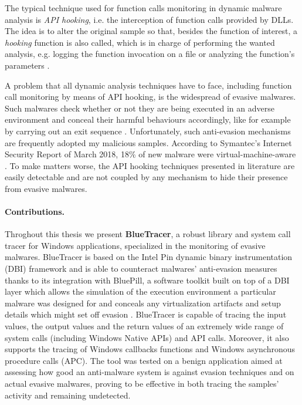 The typical technique used for function calls monitoring in dynamic malware analysis is \textit{API hooking}, i.e. the interception of function calls provided by DLLs. The idea is to alter the original sample so that, besides the function of interest, a \textit{hooking} function is also called, which is in charge of performing the wanted analysis, e.g. logging the function invocation on a file or analyzing the function's parameters \cite{Egele:2008:SAD:2089125.2089126}.      

A problem that all dynamic analysis techniques have to face, including function call monitoring by means of API hooking, is the widespread of evasive malwares. Such malwares check whether or not they are being executed in an adverse environment and conceal their harmful behaviours accordingly, like for example by carrying out an exit sequence \cite{BluePill}. Unfortunately, such anti-evasion mechanisms are frequently adopted my malicious samples. According to Symantec's Internet Security Report of March 2018, 18\% of new malware were virtual-machine-aware \cite{Symantec}. To make matters worse, the API hooking techniques presented in literature are easily detectable and are not coupled by any mechanism to hide their presence from evasive malwares.

\paragraph{Contributions.}
Throghout this thesis we present \textbf{BlueTracer}, a robust library and system call tracer for Windows applications, specialized in the monitoring of evasive malwares. BlueTracer is based on the Intel Pin \cite{Pin} dynamic binary instrumentation (DBI) framework and is able to counteract malwares' anti-evasion measures thanks to its integration with BluePill, a software toolkit built on top of a DBI layer which allows the simulation of the execution environment a particular malware was designed for and conceals any virtualization artifacts and setup details which might set off evasion \cite{BluePill}. BlueTracer is capable of tracing the input values, the output values and the return values of an extremely wide range of system calls (including Windows Native APIs) and API calls. Moreover, it also supports the tracing of Windows callbacks functions and Windows asynchronous procedure calls (APC). The tool was tested on a benign application aimed at assessing how good an anti-malware system is against evasion techniques and on actual evasive malwares, proving to be effective in both tracing the samples' activity and remaining undetected.                


